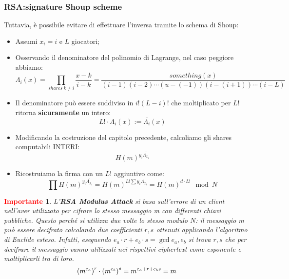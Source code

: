 \documentclass{book}
\newtheorem*{Importante}{\textbf{\textcolor{red}{Importante}}}
\begin{document}
\subsubsection{RSA:signature Shoup scheme}
Tuttavia, è possibile evitare di effettuare l'inversa tramite lo schema di Shoup:\begin{itemize}
	\item Assumi \(x_{i}=i\) e \(L\) giocatori;
	\item Osservando il denominatore del polinomio di Lagrange, nel caso peggiore abbiamo:\begin{equation*}
		      \Lambda_{i}(x)=\prod_{shares\ k\neq i}{\frac{x-k}{i-k}}=\frac{something(x)}{(i-1)(i-2)\cdots (u-(-1))(i-(i+1))\cdots (i-L)}
	      \end{equation*}
	\item Il denominatore può essere suddiviso in \(i!(L-i)! \) che moltiplicato per \(L! \) ritorna \textbf{sicuramente} un intero:\begin{equation*}
		      L! \cdot \Lambda_{i}(x):=\overline{\Lambda_{i}}(x)
	      \end{equation*}
	\item Modificando la costruzione del capitolo precedente, calcoliamo gli shares computabili INTERI:\begin{equation*}
		      {H(m)}^{y_{i}\overline{\Lambda_{x_{i}}}}
	      \end{equation*}
	\item Ricostruiamo la firma con un \(L! \) aggiuntivo come:\begin{equation*}
		      \prod{H(m)}^{y_{i}\overline{\Lambda_{x_{i}}}}={H(m)}^{L! \sum{y_{i}\Lambda_{x_{i}}}}={H(m)}^{d\cdot L! }\mod{N}
	      \end{equation*}
\end{itemize}
\begin{Importante}
	L'\textbf{RSA Modulus Attack} si basa sull'errore di un client nell'aver utilizzato per cifrare lo stesso messaggio m con differenti chiavi pubbliche\@. Questo perché si utilizza due volte lo stesso modulo \(N\): il messaggio m può essere decifrato calcolando due coefficienti \(r,s\) ottenuti applicando l'algoritmo di Euclide esteso\@. \newline
	Infatti, eseguendo \(e_{a}\cdot r+e_{b}\cdot s=\gcd{e_{a},e_{b}} \) si trova \(r,s\) che per decifrare il messaggio vanno utilizzati nei rispettivi ciphertext come esponente e moltiplicarli tra di loro.
	\begin{equation*}
		\centering
		{(m^{e_{a}})}^{r}\cdot {(m^{e_{b}})}^{s}=m^{e_{a}+r+e_{b}s}=m
	\end{equation*}
\end{Importante}
\end{document}
